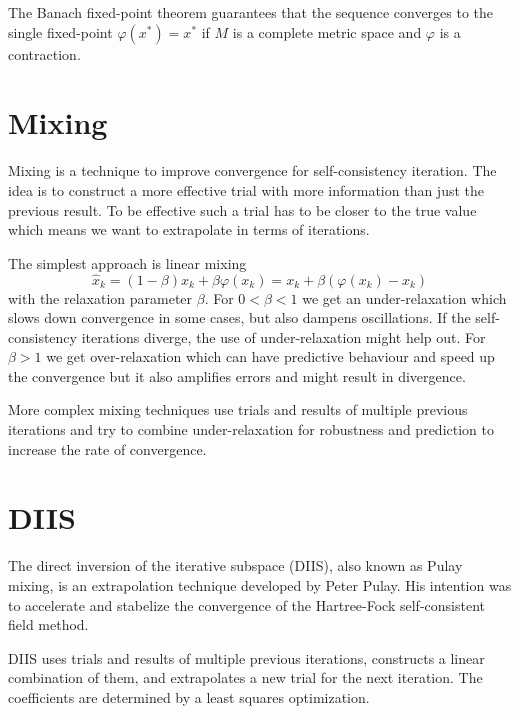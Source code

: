 The Banach fixed-point theorem guarantees that the sequence converges to the single fixed-point \(\varphi(x^\ast) = x^\ast\) if \(M\) is a complete metric space and \(\varphi\) is a contraction.

\section{Mixing}

Mixing is a technique to improve convergence for self-consistency iteration. The idea is to construct a more effective trial with more information than just the previous result. To be effective such a trial has to be closer to the true value which means we want to extrapolate in terms of iterations.

The simplest approach is linear mixing
\begin{equation} \label{eq:linmix}
\hat{x}_k = (1-\beta) x_k + \beta \varphi(x_k) = x_k + \beta (\varphi(x_k) - x_k)
\end{equation}
with the relaxation parameter \(\beta\).
For \(0 < \beta < 1\) we get an under-relaxation which slows down convergence in some cases, but also dampens oscillations. If the self-consistency iterations diverge, the use of under-relaxation might help out.
For \(\beta > 1\) we get over-relaxation which can have predictive behaviour and speed up the convergence but it also amplifies errors and might result in divergence.

More complex mixing techniques use trials and results of multiple previous iterations and try to combine under-relaxation for robustness and prediction to increase the rate of convergence.

\section{DIIS}

The direct inversion of the iterative subspace (DIIS), also known as Pulay mixing, is an extrapolation technique developed by Peter Pulay. His intention was to accelerate and stabelize the convergence of the Hartree-Fock self-consistent field method.\cite{diis_pulay1}\cite{diis_pulay2} %

DIIS uses trials and results of multiple previous iterations, constructs a linear combination of them, and extrapolates a new trial for the next iteration. The coefficients are determined by a least squares optimization.

